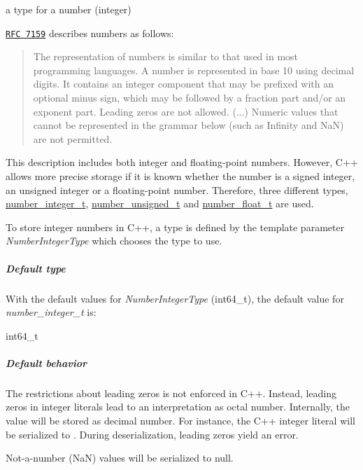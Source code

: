 a type for a number (integer) 

\href{http://rfc7159.net/rfc7159}{\tt R\-F\-C 7159} describes numbers as follows\-: \begin{quotation}
The representation of numbers is similar to that used in most programming languages. A number is represented in base 10 using decimal digits. It contains an integer component that may be prefixed with an optional minus sign, which may be followed by a fraction part and/or an exponent part. Leading zeros are not allowed. (...) Numeric values that cannot be represented in the grammar below (such as Infinity and Na\-N) are not permitted.

\end{quotation}


This description includes both integer and floating-\/point numbers. However, C++ allows more precise storage if it is known whether the number is a signed integer, an unsigned integer or a floating-\/point number. Therefore, three different types, \hyperlink{classnlohmann_1_1basic__json_ac4b10b2364f26ce47bdb9a413ff04a59}{number\-\_\-integer\-\_\-t}, \hyperlink{classnlohmann_1_1basic__json_a60a04166c122072ab11eaf9845d9cd1d}{number\-\_\-unsigned\-\_\-t} and \hyperlink{classnlohmann_1_1basic__json_a74a0013e847fdc574b48f931f0e757e1}{number\-\_\-float\-\_\-t} are used.

To store integer numbers in C++, a type is defined by the template parameter {\itshape Number\-Integer\-Type} which chooses the type to use.

\subparagraph*{Default type}

With the default values for {\itshape Number\-Integer\-Type} ({\ttfamily int64\-\_\-t}), the default value for {\itshape number\-\_\-integer\-\_\-t} is\-:


\begin{DoxyCode}
int64\_t
\end{DoxyCode}


\subparagraph*{Default behavior}


\begin{DoxyItemize}
\item The restrictions about leading zeros is not enforced in C++. Instead, leading zeros in integer literals lead to an interpretation as octal number. Internally, the value will be stored as decimal number. For instance, the C++ integer literal {} will be serialized to {}. During deserialization, leading zeros yield an error.
\item Not-\/a-\/number (Na\-N) values will be serialized to {\ttfamily null}.
\end{DoxyItemize}


